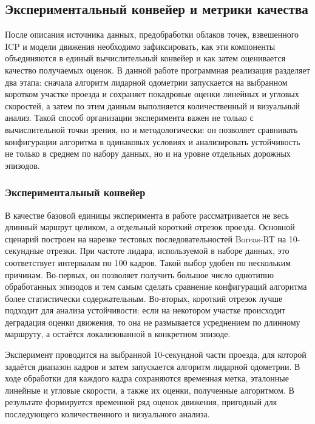 \subsection{Экспериментальный конвейер и метрики качества}
\label{sec:2-5-pipeline-metrics}

После описания источника данных, предобработки облаков точек, взвешенного ICP и модели движения необходимо зафиксировать, как эти компоненты объединяются в единый вычислительный конвейер и как затем оценивается качество получаемых оценок. В данной работе программная реализация разделяет два этапа: сначала алгоритм лидарной одометрии запускается на выбранном коротком участке проезда и сохраняет покадровые оценки линейных и угловых скоростей, а затем по этим данным выполняется количественный и визуальный анализ. Такой способ организации эксперимента важен не только с вычислительной точки зрения, но и методологически: он позволяет сравнивать конфигурации алгоритма в одинаковых условиях и анализировать устойчивость не только в среднем по набору данных, но и на уровне отдельных дорожных эпизодов.

\subsubsection{Экспериментальный конвейер}

В качестве базовой единицы эксперимента в работе рассматривается не весь длинный маршрут целиком, а отдельный короткий отрезок проезда. Основной сценарий построен на нарезке тестовых последовательностей Boreas-RT на 10-секундные отрезки. При частоте лидара, используемой в наборе данных, это соответствует интервалам по 100 кадров. Такой выбор удобен по нескольким причинам. Во-первых, он позволяет получить большое число однотипно обработанных эпизодов и тем самым сделать сравнение конфигураций алгоритма более статистически содержательным. Во-вторых, короткий отрезок лучше подходит для анализа устойчивости: если на некотором участке происходит деградация оценки движения, то она не размывается усреднением по длинному маршруту, а остаётся локализованной в конкретном эпизоде.

Эксперимент проводится на выбранной 10-секундной части проезда, для которой задаётся диапазон кадров и затем запускается алгоритм лидарной одометрии. В ходе обработки для каждого кадра сохраняются временная метка, эталонные линейные и угловые скорости, а также их оценки, полученные алгоритмом. В результате формируется временной ряд оценок движения, пригодный для последующего количественного и визуального анализа.

